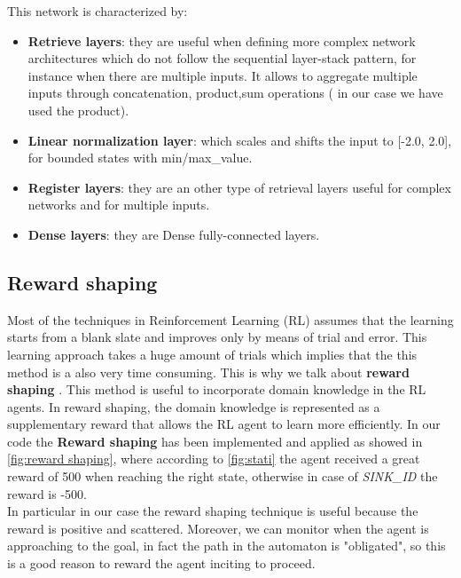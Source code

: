\documentclass{article}
\begin{document}
\noindent
This network is characterized by:\\
\begin{itemize}
    \item \textbf{Retrieve layers}: they are useful when defining more complex network architectures which do not follow the sequential layer-stack pattern, for instance when there are multiple inputs. It allows to aggregate multiple inputs  through concatenation, product,sum operations ( in our case we have used the product). 
    \item \textbf{Linear normalization layer}:  which scales and shifts the input to [-2.0, 2.0], for bounded states with min/max\_value. 
    \item \textbf{Register layers}: they are an other type of retrieval layers useful for complex networks and for multiple inputs.
    \item \textbf{Dense layers}: they are Dense fully-connected layers.
\end{itemize}

\subsection{Reward shaping}\label{sec:rewardShaping}
Most of the techniques in Reinforcement Learning (RL) assumes that the learning starts from a blank slate and improves only by means of trial and error. This learning approach takes a huge amount of trials which implies that the this method is a also very time consuming. This is why we talk about \textbf{reward shaping} \citep{rf}. This method is useful to incorporate domain knowledge in the RL agents. In reward shaping, the domain knowledge is represented as a supplementary reward that allows the RL agent to learn more efficiently.
In our code the \textbf{Reward shaping} has been implemented and applied as showed in \ref{fig:reward shaping}, where according to \ref{fig:stati} the agent received a great reward of 500 when reaching the right state, otherwise in case of \textit{SINK\_ID} the reward is -500.\\
In particular in our case the reward shaping technique is useful because the reward is positive and scattered. Moreover, we can monitor when the agent is approaching to the goal, in fact the path in the automaton is "obligated", so this is a good reason to reward the agent inciting to proceed.
\end{document}
